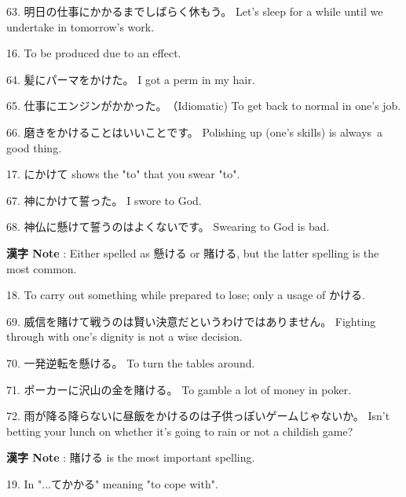 \par{63. 明日の仕事にかかるまでしばらく休もう。 \hfill\break
Let's sleep for a while until we undertake in tomorrow's work. }

\par{16. To be produced due to an effect. }

\par{64. 髪にパーマをかけた。 \hfill\break
I got a perm in my hair. }

\par{65. 仕事にエンジンがかかった。　（Idiomatic) \hfill\break
To get back to normal in one's job. }

\par{66. 磨きをかけることはいいことです。 \hfill\break
Polishing up (one's skills) is always a good thing. }

\par{17. にかけて shows the "to" that you swear "to". }

\par{67. 神にかけて誓った。 \hfill\break
I swore to God. }

\par{68. 神仏に懸けて誓うのはよくないです。 \hfill\break
Swearing to God is bad. }

\par{\textbf{漢字 Note }: Either spelled as 懸ける or 賭ける, but the latter spelling is the most common. }

\par{18. To carry out something while prepared to lose; only a usage of かける. }

\par{69. 威信を賭けて戦うのは賢い決意だというわけではありません。 \hfill\break
Fighting through with one's dignity is not a wise decision. }

\par{70. 一発逆転を懸ける。 \hfill\break
To turn the tables around. }

\par{71. ポーカーに沢山の金を賭ける。 \hfill\break
To gamble a lot of money in poker. }

\par{72. 雨が降る降らないに昼飯をかけるのは子供っぽいゲームじゃないか。 \hfill\break
Isn't betting your lunch on whether it's going to rain or not a childish game? }

\par{\textbf{漢字 Note }: 賭ける is the most important spelling. }

\par{19. In "\dothyp{}\dothyp{}\dothyp{}てかかる" meaning "to cope with". }


